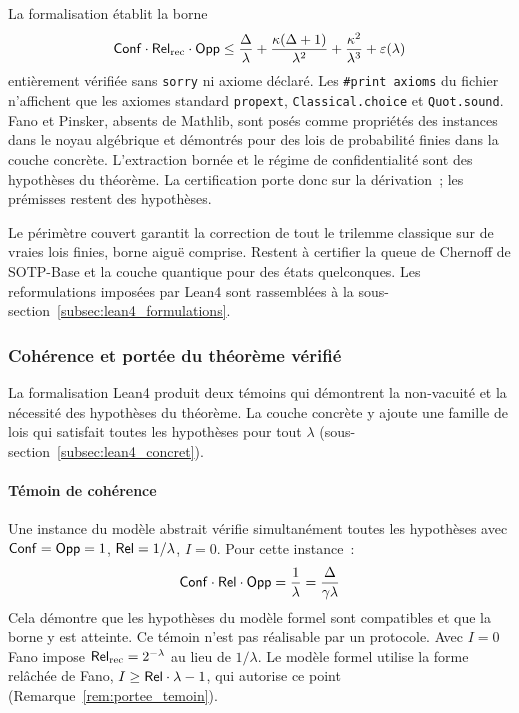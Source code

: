 \begin{sloppypar}
La formalisation \'etablit la borne
\begin{equation}
\mathsf{Conf} \cdot \mathsf{Rel}_{\mathrm{rec}} \cdot \mathsf{Opp} \leq \frac{\Delta}{\lambda}
+ \frac{\kappa(\Delta+1)}{\lambda^2} + \frac{\kappa^2}{\lambda^3} + \varepsilon(\lambda)
\end{equation}
enti\`erement v\'erifi\'ee sans \texttt{sorry} ni axiome d\'eclar\'e. Les
\texttt{\#print axioms} du fichier n'affichent que les axiomes standard
\texttt{propext}, \texttt{Classical.choice} et \texttt{Quot.sound}. Fano et Pinsker, absents de Mathlib, sont
pos\'es comme propri\'et\'es des instances dans le noyau alg\'ebrique et d\'emontr\'es
pour des lois de probabilit\'e finies dans la couche concr\`ete. L'extraction born\'ee et
le r\'egime de confidentialit\'e sont des hypoth\`eses du th\'eor\`eme. La
certification porte donc sur la d\'erivation~; les pr\'emisses restent des hypoth\`eses.

Le p\'erim\`etre couvert garantit la correction de tout le trilemme classique sur de vraies
lois finies, borne aigu\"e comprise. Restent \`a certifier la queue de Chernoff de SOTP-Base et
la couche quantique pour des \'etats quelconques. Les reformulations impos\'ees par Lean4 sont rassembl\'ees \`a la
sous-section~\ref{subsec:lean4_formulations}.

\subsubsection{Coh\'erence et port\'ee du th\'eor\`eme v\'erifi\'e}
\label{subsubsec:coherence_portee}

La formalisation Lean4 produit deux t\'emoins qui d\'emontrent la
non-vacuit\'e et la n\'ecessit\'e des hypoth\`eses du th\'eor\`eme. La couche concr\`ete y
ajoute une famille de lois qui satisfait toutes les hypoth\`eses pour tout $\lambda$
(sous-section~\ref{subsec:lean4_concret}).

\paragraph{T\'emoin de coh\'erence}

Une instance du mod\`ele abstrait v\'erifie simultan\'ement toutes les
hypoth\`eses avec $\mathsf{Conf} = \mathsf{Opp} = 1$, $\mathsf{Rel} = 1/\lambda$, $I = 0$. Pour cette
instance~:
\begin{equation}
\mathsf{Conf} \cdot \mathsf{Rel} \cdot \mathsf{Opp} = \frac{1}{\lambda}
= \frac{\Delta}{\gamma \lambda}
\end{equation}
Cela d\'emontre que les hypoth\`eses du mod\`ele formel sont compatibles et que
la borne y est atteinte. Ce t\'emoin n'est pas r\'ealisable par un protocole.
Avec $I = 0$ Fano impose $\mathsf{Rel}_{\mathrm{rec}} = 2^{-\lambda}$ au lieu de $1/\lambda$. Le mod\`ele
formel utilise la forme rel\^ach\'ee de Fano, $I \geq \mathsf{Rel}\cdot\lambda - 1$, qui
autorise ce point (Remarque~\ref{rem:portee_temoin}).


\end{sloppypar}
